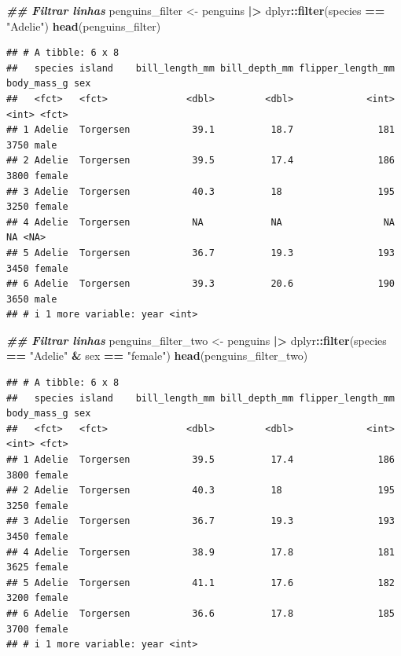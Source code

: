 \documentclass[
]{article}
\newenvironment{Shaded}{\begin{snugshade}}{\end{snugshade}}
\newcommand{\DocumentationTok}[1]{\textcolor[rgb]{0.56,0.35,0.01}{\textbf{\textit{#1}}}}
\newcommand{\FunctionTok}[1]{\textcolor[rgb]{0.13,0.29,0.53}{\textbf{#1}}}
\newcommand{\NormalTok}[1]{#1}
\newcommand{\OtherTok}[1]{\textcolor[rgb]{0.56,0.35,0.01}{#1}}
\newcommand{\SpecialCharTok}[1]{\textcolor[rgb]{0.81,0.36,0.00}{\textbf{#1}}}
\newcommand{\StringTok}[1]{\textcolor[rgb]{0.31,0.60,0.02}{#1}}
\begin{document}
\begin{Shaded}
\begin{Highlighting}[]
\DocumentationTok{\#\# Filtrar linhas}
\NormalTok{penguins\_filter }\OtherTok{\textless{}{-}}\NormalTok{ penguins }\SpecialCharTok{|\textgreater{}} 
\NormalTok{    dplyr}\SpecialCharTok{::}\FunctionTok{filter}\NormalTok{(species }\SpecialCharTok{==} \StringTok{"Adelie"}\NormalTok{)}
\FunctionTok{head}\NormalTok{(penguins\_filter)}
\end{Highlighting}
\end{Shaded}

\begin{verbatim}
## # A tibble: 6 x 8
##   species island    bill_length_mm bill_depth_mm flipper_length_mm body_mass_g sex   
##   <fct>   <fct>              <dbl>         <dbl>             <int>       <int> <fct> 
## 1 Adelie  Torgersen           39.1          18.7               181        3750 male  
## 2 Adelie  Torgersen           39.5          17.4               186        3800 female
## 3 Adelie  Torgersen           40.3          18                 195        3250 female
## 4 Adelie  Torgersen           NA            NA                  NA          NA <NA>  
## 5 Adelie  Torgersen           36.7          19.3               193        3450 female
## 6 Adelie  Torgersen           39.3          20.6               190        3650 male  
## # i 1 more variable: year <int>
\end{verbatim}

\begin{Shaded}
\begin{Highlighting}[]
\DocumentationTok{\#\# Filtrar linhas}
\NormalTok{penguins\_filter\_two }\OtherTok{\textless{}{-}}\NormalTok{ penguins }\SpecialCharTok{|\textgreater{}} 
\NormalTok{    dplyr}\SpecialCharTok{::}\FunctionTok{filter}\NormalTok{(species }\SpecialCharTok{==} \StringTok{"Adelie"} \SpecialCharTok{\&}\NormalTok{ sex }\SpecialCharTok{==} \StringTok{"female"}\NormalTok{)}
\FunctionTok{head}\NormalTok{(penguins\_filter\_two)}
\end{Highlighting}
\end{Shaded}

\begin{verbatim}
## # A tibble: 6 x 8
##   species island    bill_length_mm bill_depth_mm flipper_length_mm body_mass_g sex   
##   <fct>   <fct>              <dbl>         <dbl>             <int>       <int> <fct> 
## 1 Adelie  Torgersen           39.5          17.4               186        3800 female
## 2 Adelie  Torgersen           40.3          18                 195        3250 female
## 3 Adelie  Torgersen           36.7          19.3               193        3450 female
## 4 Adelie  Torgersen           38.9          17.8               181        3625 female
## 5 Adelie  Torgersen           41.1          17.6               182        3200 female
## 6 Adelie  Torgersen           36.6          17.8               185        3700 female
## # i 1 more variable: year <int>
\end{verbatim}
\end{document}
